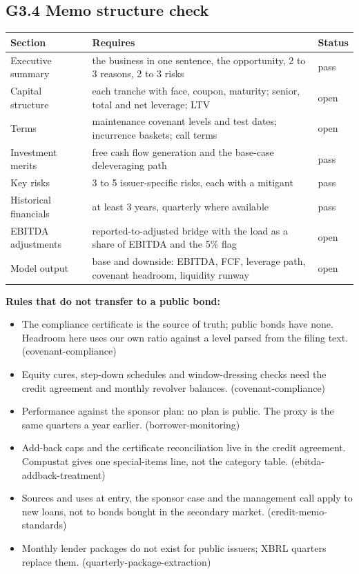 \documentclass[11pt,a4paper]{article}
\begin{document}
\subsection*{G3.4 Memo structure check}
\begin{center}\footnotesize\setlength{\tabcolsep}{3.5pt}\begin{tabular}{@{}lp{9cm}l@{}}\toprule
Section & Requires & Status \\\midrule
Executive summary & the business in one sentence, the opportunity, 2 to 3 reasons, 2 to 3 risks & \textcolor{good}{pass} \\
Capital structure & each tranche with face, coupon, maturity; senior, total and net leverage; LTV & \textcolor{amber}{open} \\
Terms & maintenance covenant levels and test dates; incurrence baskets; call terms & \textcolor{amber}{open} \\
Investment merits & free cash flow generation and the base-case deleveraging path & \textcolor{good}{pass} \\
Key risks & 3 to 5 issuer-specific risks, each with a mitigant & \textcolor{good}{pass} \\
Historical financials & at least 3 years, quarterly where available & \textcolor{good}{pass} \\
EBITDA adjustments & reported-to-adjusted bridge with the load as a share of EBITDA and the 5\% flag & \textcolor{amber}{open} \\
Model output & base and downside: EBITDA, FCF, leverage path, covenant headroom, liquidity runway & \textcolor{amber}{open} \\
\bottomrule\end{tabular}\end{center}
\textbf{Rules that do not transfer to a public bond:}\begin{itemize}\item The compliance certificate is the source of truth; public bonds have none. Headroom here uses our own ratio against a level parsed from the filing text. (covenant-compliance)\item Equity cures, step-down schedules and window-dressing checks need the credit agreement and monthly revolver balances. (covenant-compliance)\item Performance against the sponsor plan: no plan is public. The proxy is the same quarters a year earlier. (borrower-monitoring)\item Add-back caps and the certificate reconciliation live in the credit agreement. Compustat gives one special-items line, not the category table. (ebitda-addback-treatment)\item Sources and uses at entry, the sponsor case and the management call apply to new loans, not to bonds bought in the secondary market. (credit-memo-standards)\item Monthly lender packages do not exist for public issuers; XBRL quarters replace them. (quarterly-package-extraction)\end{itemize}
\end{document}
